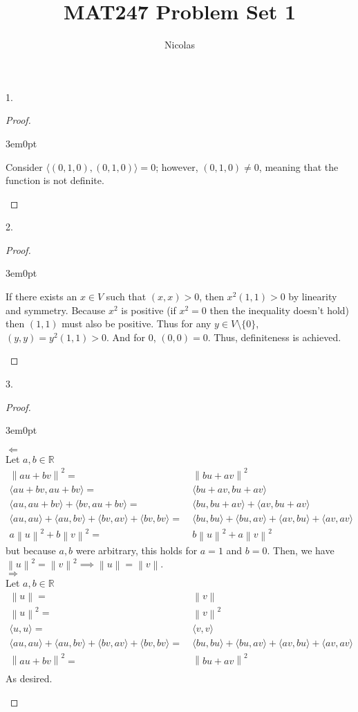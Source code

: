 \documentclass[11pt]{article}
\title{MAT247 Problem Set 1}
\author{Nicolas}
\newcommand{\R}{\mathbb{R}}
\newcommand{\norm}[1]{\left\lVert#1\right\rVert}
\newcommand{\inn}[2]{\langle#1,#2\rangle}
\newenvironment{myproof}
{\begin{proof} \begin{adjustwidth}{3em}{0pt}$ $\par\nobreak\ignorespaces}
{\end{adjustwidth} \end{proof}}
\begin{document}
\maketitle
\begin{flushleft}

1.

\begin{myproof}

Consider $\inn{(0,1,0)}{(0,1,0)} = 0$; however, $(0,1,0) \neq 0$, meaning that the function is not definite.

\end{myproof}

\newpage

2.

\begin{myproof}

If there exists an $x \in V$ such that $(x,x) > 0$, then $x^2(1,1)>0$ by linearity and symmetry. Because $x^2$ is positive (if $x^2= 0$ then the inequality doesn't hold) then $(1,1)$ must also be positive. Thus for any $y \in V \setminus \{ 0 \}$, $(y,y) = y^2(1,1) > 0$. And for 0, $(0,0) = 0$. Thus, definiteness is achieved.

\end{myproof}

\newpage

3.

\begin{myproof}

$\Leftarrow$ \\
\bigskip
Let $a,b \in \R$
\begin{align*}
\norm{au+bv}^2 = & \ \norm{bu + av}^2 \\
\inn{au+bv}{au+bv} = & \ \inn{bu+av}{bu+av} \\
\inn{au}{au+bv} + \inn{bv}{au+bv} = & \ \inn{bu}{bu+av} + \inn{av}{bu+av} \\
\inn{au}{au} + \inn{au}{bv} + \inn{bv}{av} + \inn{bv}{bv} = & \ \inn{bu}{bu} +\inn{bu}{av} + \inn{av}{bu} + \inn{av}{av} \\
a \norm{u}^2 + b \norm{v}^2 = & \ b \norm{u}^2 + a \norm{v}^2
\end{align*}
but because $a,b$ were arbitrary, this holds for $a=1$ and $b=0$. Then, we have $\norm{u}^2 = \norm{v}^2 \implies \norm{u} = \norm{v}$. \\
\bigskip
$\Rightarrow$ \\
\bigskip
Let $a,b \in \R$
\begin{align*}
\norm{u} = & \ \norm{v} \\
\norm{u}^2 = & \ \norm{v}^2 \\
\inn{u}{u} = & \ \inn{v}{v} \\
\inn{au}{au} + \inn{au}{bv} + \inn{bv}{av} + \inn{bv}{bv} = & \ \inn{bu}{bu} +\inn{bu}{av} + \inn{av}{bu} + \inn{av}{av} \\
\norm{au+bv}^2 = & \ \norm{bu + av}^2 \\
\end{align*}
As desired.


\end{myproof}
\end{flushleft}
\end{document}
